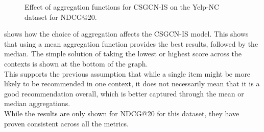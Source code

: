 \begin{figure}
    \caption{Effect of aggregation functions for CSGCN-IS on the Yelp-NC dataset for NDCG@20.}
    \label{fig:aggregation_effect}
\end{figure}
 shows how the choice of aggregation affects the CSGCN-IS model.
This shows that using a mean aggregation function provides the best results, followed by the median.
The simple solution of taking the lowest or highest score across the contexts is shown at the bottom of the graph.\\
This supports the previous assumption that while a single item might be more likely to be recommended in one context, it does not necessarily mean that it is a good recommendation overall, which is better captured through the mean or median aggregations.\\
While the results are only shown for NDCG@20 for this dataset, they have proven consistent across all the metrics.

